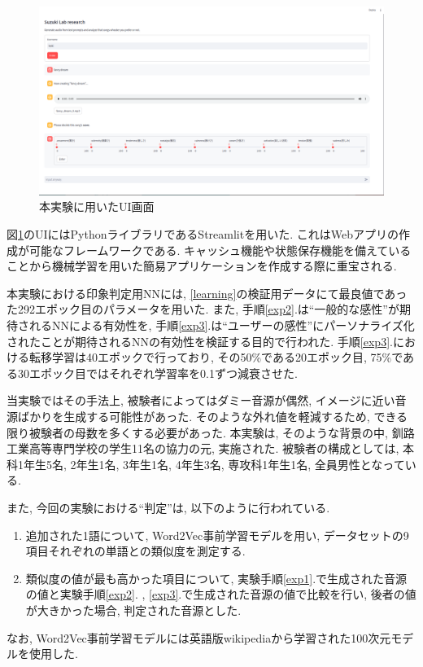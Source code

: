 \documentclass[a4paper,11pt,dvipdfmx]{jreport}
\begin{document}
\begin{figure}[htbp]
  \centering
  \includegraphics[width=0.9\linewidth]{UI.png}
  \caption{本実験に用いたUI画面}
  \label{UI1}
\end{figure}

\newpage
図\ref{UI1}のUIにはPythonライブラリであるStreamlit\cite{stream}を用いた.
これはWebアプリの作成が可能なフレームワークである. 
キャッシュ機能や状態保存機能を備えていることから機械学習を用いた簡易アプリケーションを作成する際に重宝される.

本実験における印象判定用NNには, \ref{learning}の検証用データにて最良値であった292エポック目のパラメータを用いた.
また, 手順\ref{exp2}.は``一般的な感性''が期待されるNNによる有効性を, 手順\ref{exp3}.は``ユーザーの感性''にパーソナライズ化されたことが期待されるNNの有効性を検証する目的で行われた.
手順\ref{exp3}.における転移学習は40エポックで行っており, その50\%である20エポック目, 75\%である30エポック目ではそれぞれ学習率を0.1ずつ減衰させた.


当実験ではその手法上, 被験者によってはダミー音源が偶然, イメージに近い音源ばかりを生成する可能性があった.
そのような外れ値を軽減するため, できる限り被験者の母数を多くする必要があった.
本実験は, そのような背景の中, 釧路工業高等専門学校の学生11名の協力の元, 実施された.
被験者の構成としては, 本科1年生5名, 2年生1名, 3年生1名, 4年生3名, 専攻科1年生1名, 全員男性となっている.

また, 今回の実験における``判定''は, 以下のように行われている.
\begin{enumerate}
  \item 追加された1語について, Word2Vec事前学習モデルを用い, 
        データセットの9項目それぞれの単語との類似度を測定する.
  \item 類似度の値が最も高かった項目について, 
        実験手順\ref{exp1}.で生成された音源の値と実験手順\ref{exp2}. , \ref{exp3}.で生成された音源の値で比較を行い, 後者の値が大きかった場合, 
        判定された音源とした.
\end{enumerate}
なお, Word2Vec事前学習モデルには英語版wikipediaから学習された100次元モデル\cite{NLP}を使用した.
\end{document}
